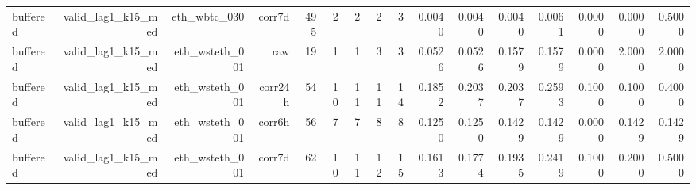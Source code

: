 \begin{tabular}{lrrrrrrrrrrrrrrr}
buffered & valid\_lag1\_k15\_med & eth\_wbtc\_030 & corr7d & 495 & 2 & 2 & 2 & 3 & 0.0040 & 0.0040 & 0.0040 & 0.0061 & 0.0000 & 0.0000 & 0.5000 \\
buffered & valid\_lag1\_k15\_med & eth\_wsteth\_001 & raw & 19 & 1 & 1 & 3 & 3 & 0.0526 & 0.0526 & 0.1579 & 0.1579 & 0.0000 & 2.0000 & 2.0000 \\
buffered & valid\_lag1\_k15\_med & eth\_wsteth\_001 & corr24h & 54 & 10 & 11 & 11 & 14 & 0.1852 & 0.2037 & 0.2037 & 0.2593 & 0.1000 & 0.1000 & 0.4000 \\
buffered & valid\_lag1\_k15\_med & eth\_wsteth\_001 & corr6h & 56 & 7 & 7 & 8 & 8 & 0.1250 & 0.1250 & 0.1429 & 0.1429 & 0.0000 & 0.1429 & 0.1429 \\
buffered & valid\_lag1\_k15\_med & eth\_wsteth\_001 & corr7d & 62 & 10 & 11 & 12 & 15 & 0.1613 & 0.1774 & 0.1935 & 0.2419 & 0.1000 & 0.2000 & 0.5000 \\
\bottomrule
\end{tabular}